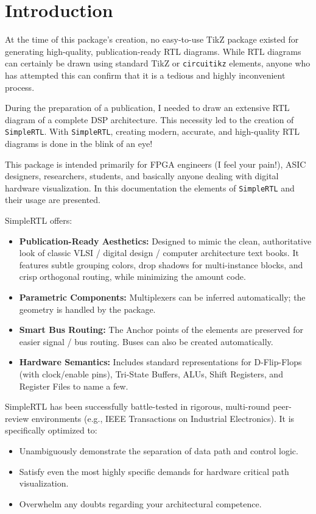 \chapter{\sffamily Introduction}
At the time of this package's creation, no easy-to-use TikZ package existed for generating high-quality, publication-ready RTL diagrams. While RTL diagrams can certainly be drawn using standard TikZ or \texttt{circuitikz} elements, anyone who has attempted this can confirm that it is a tedious and highly inconvenient process.

During the preparation of a publication, I needed to draw an extensive RTL diagram of a complete DSP architecture. This necessity led to the creation of \texttt{SimpleRTL}. With \texttt{SimpleRTL}, creating modern, accurate, and high-quality RTL diagrams is done in the blink of an eye! 

This package is intended primarily for FPGA engineers (I feel your pain!), ASIC designers, researchers, students, and basically anyone dealing with digital hardware visualization.
In this documentation the elements of \texttt{SimpleRTL} and their usage are presented.

SimpleRTL offers:
\begin{itemize}
    \item \textbf{Publication-Ready Aesthetics:}
        Designed to mimic the clean, authoritative look of classic VLSI / digital design / computer architecture text books. It features subtle grouping colors, drop shadows for multi-instance blocks, and crisp orthogonal routing, while minimizing the amount code.
    \item \textbf{Parametric Components:}
        Multiplexers can be inferred automatically; the geometry is handled by the package.
    \item \textbf{Smart Bus Routing:}
        The Anchor points of the elements are preserved for easier signal / bus routing. Buses can also be created automatically. 
    \item \textbf{Hardware Semantics:}
        Includes standard representations for D-Flip-Flops (with clock/enable pins), Tri-State Buffers, ALUs, Shift Registers, and Register Files to name a few.
\end{itemize}

SimpleRTL has been successfully battle-tested in rigorous, multi-round peer-review environments (e.g., IEEE Transactions on Industrial Electronics). It is specifically optimized to:
    \begin{itemize}
        \item Unambiguously demonstrate the separation of data path and control logic.
        \item Satisfy even the most highly specific demands for hardware critical path visualization.
        \item Overwhelm any doubts regarding your architectural competence.
    \end{itemize}

